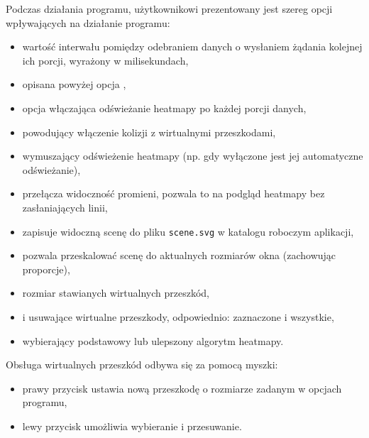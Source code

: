 Podczas działania programu, użytkownikowi prezentowany jest szereg opcji wpływających na działanie programu:
\begin{itemize}
 \item {} wartość interwału pomiędzy odebraniem danych o wysłaniem żądania kolejnej ich porcji, wyrażony w milisekundach,
 \item opisana powyżej opcja ,
 \item {} opcja włączająca odświeżanie heatmapy po każdej porcji danych,
 \item {} powodujący włączenie kolizji z wirtualnymi przeszkodami,
 \item {} wymuszający odświeżenie heatmapy (np. gdy wyłączone jest jej automatyczne odświeżanie),
 \item {} przełącza widoczność promieni, pozwala to na podgląd heatmapy bez zasłaniających linii,
 \item {} zapisuje widoczną scenę do pliku \texttt{scene.svg} w katalogu roboczym aplikacji,
 \item {} pozwala przeskalować scenę do aktualnych rozmiarów okna (zachowując proporcje),
 \item {} rozmiar stawianych wirtualnych przeszkód,
 \item {} i  usuwające wirtualne przeszkody, odpowiednio: zaznaczone i wszystkie,
 \item {} wybierający podstawowy lub ulepszony algorytm heatmapy.
\end{itemize}

Obsługa wirtualnych przeszkód odbywa się za pomocą myszki:
\begin{itemize}
 \item prawy przycisk ustawia nową przeszkodę o rozmiarze zadanym w opcjach programu,
 \item lewy przycisk umożliwia wybieranie i przesuwanie.
\end{itemize}
